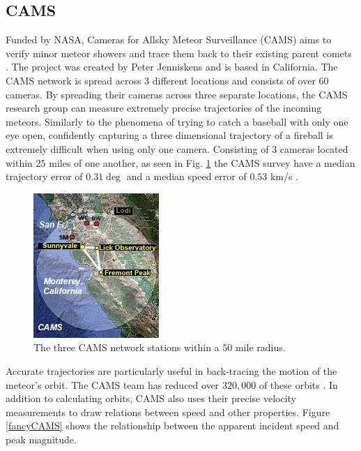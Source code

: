 \subsection{CAMS}
Funded by NASA, Cameras for Allsky Meteor Surveillance (CAMS) aims to verify minor meteor showers and trace them back to their existing parent comets \cite{jenniskens_cams:_2011}.  
The project was created by Peter Jenniskens and is based in California.  
The CAMS network is spread across 3 different locations and consists of over 60 cameras.
By spreading their cameras across three separate locations, the CAMS research group can measure extremely precise trajectories of the incoming meteors. 
Similarly to the phenomena of trying to catch a baseball with only one eye open, confidently capturing a three dimensional trajectory of a fireball is extremely difficult when using only one camera.
Consisting of $3$ cameras located within $25$ miles of one another, as seen in Fig. \ref{trio} the CAMS survey have a median trajectory error of $0.31\deg$ and a median speed error of $0.53$ km/s \cite{jenniskens_cams:_2011}. 

\begin{figure}[ht!]
  \centering
  \includegraphics[scale=0.7]{images/CAMS_trio.jpg}
  \caption{The three CAMS network stations within a $50$ mile radius.}
  \label{trio}
\end{figure}

Accurate trajectories are particularly useful in back-tracing the motion of the meteor's orbit.  
The CAMS team has reduced over $320,000$ of these orbits \cite{seticams}. 
In addition to calculating orbits, CAMS also uses their precise velocity measurements to draw relations between speed and other properties. 
Figure \ref{fancyCAMS} shows the relationship between the apparent incident speed and peak magnitude.


